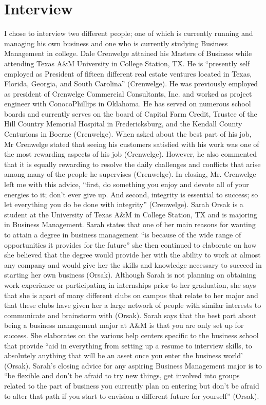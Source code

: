 \section{Interview}
I chose to interview two different people; one of which is currently running and managing his own business and one who is currently studying Business Management in college.
    Dale Crenwelge attained his Masters of Business while attending Texas A\&M University in College Station, TX. He is “presently self employed as President of fifteen different real estate ventures located in Texas, Florida, Georgia, and South Carolina” (Crenwelge).  He was previously employed as president of Crenwelge Commercial Consultants, Inc. and worked as project engineer with ConocoPhillips in Oklahoma. He has served on numerous school boards and currently serves on the board of Capital Farm Credit, Trustee of the Hill Country Memorial Hospital in Fredericksburg, and the Kendall County Centurions in Boerne (Crenwelge). When asked about the best part of his job, Mr Crenwelge stated that seeing his customers satisfied with his work was one of the most rewarding aspects of his job (Crenwelge). However, he also commented that it is equally rewarding to resolve the daily challenges and conflicts that arise among many of the people he supervises (Crenwelge). In closing, Mr. Crenwelge left me with this advice, “first, do something you enjoy and devote all of your energies to it; don’t ever give up. And second, integrity is essential to success; so let everything you do be done with integrity” (Crenwelge).
    Sarah Orsak is a student at the University of Texas A\&M in College Station, TX and is majoring in Business Management. Sarah states that one of her main reasons for wanting to attain a degree in business management “is because of the wide range of opportunities it provides for the future” she then continued to elaborate on how she believed that the degree would provide her with the ability to work at almost any company and would give her the skills and knowledge necessary to succeed in starting her own business (Orsak). Although Sarah is not planning on obtaining work experience or participating in internships prior to her graduation, she says that she is apart of many different clubs on campus that relate to her major and that these clubs have given her a large network of people with similar interests to communicate and brainstorm with (Orsak). Sarah says that the best part about being a business management major at A\&M is that you are only set up for success. She elaborates on the various help centers specific to the business school that provide “aid in everything from setting up a resume to interview skills, to absolutely anything that will be an asset once you enter the business world’ (Orsak). Sarah’s closing advice for any aspiring Business Management major is to “be flexible and don’t be afraid to try new things, get involved into groups related to the part of business you currently plan on entering but don’t be afraid to alter that path if you start to envision a different future for yourself” (Orsak).
